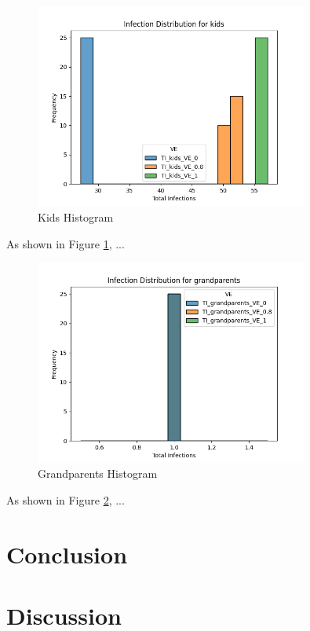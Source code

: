 \documentclass{article}
\begin{document}
\begin{figure}[htbp]
    \centering
    \includegraphics[width=0.8\textwidth]{kids}
    \caption{Kids Histogram}
    \label{fig:kids} 
\end{figure}

As shown in Figure \ref{fig:kids}, ...

\begin{figure}[htbp]
    \centering
    \includegraphics[width=0.8\textwidth]{grandparents}
    \caption{Grandparents Histogram}
    \label{fig:grandparents} 
\end{figure}

As shown in Figure \ref{fig:grandparents}, ...

\section{Conclusion}

\section{Discussion}
\end{document}

